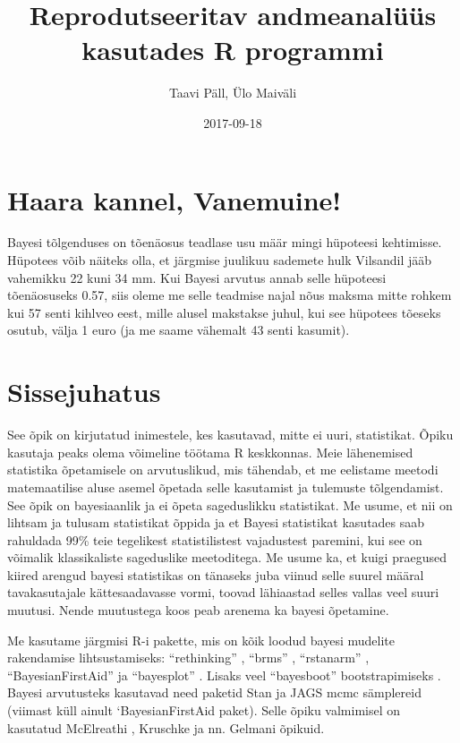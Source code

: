 \documentclass[]{book}
\title{Reprodutseeritav andmeanalüüs kasutades R programmi}
\author{Taavi Päll, Ülo Maiväli}
\date{2017-09-18}
\begin{document}
\maketitle

{
\hypersetup{linkcolor=black}
\setcounter{tocdepth}{1}
\tableofcontents
}
\chapter*{Haara kannel, Vanemuine!}\label{haara-kannel-vanemuine}

Bayesi tõlgenduses on tõenäosus teadlase usu määr mingi hüpoteesi
kehtimisse. Hüpotees võib näiteks olla, et järgmise juulikuu sademete
hulk Vilsandil jääb vahemikku 22 kuni 34 mm. Kui Bayesi arvutus annab
selle hüpoteesi tõenäosuseks 0.57, siis oleme me selle teadmise najal
nõus maksma mitte rohkem kui 57 senti kihlveo eest, mille alusel
makstakse juhul, kui see hüpotees tõeseks osutub, välja 1 euro (ja me
saame vähemalt 43 senti kasumit).

\chapter{Sissejuhatus}\label{intro}

See õpik on kirjutatud inimestele, kes kasutavad, mitte ei uuri,
statistikat. Õpiku kasutaja peaks olema võimeline töötama R keskkonnas.
Meie lähenemised statistika õpetamisele on arvutuslikud, mis tähendab,
et me eelistame meetodi matemaatilise aluse asemel õpetada selle
kasutamist ja tulemuste tõlgendamist. See õpik on bayesiaanlik ja ei
õpeta sageduslikku statistikat. Me usume, et nii on lihtsam ja tulusam
statistikat õppida ja et Bayesi statistikat kasutades saab rahuldada
99\% teie tegelikest statistilistest vajadustest paremini, kui see on
võimalik klassikaliste sageduslike meetoditega. Me usume ka, et kuigi
praegused kiired arengud bayesi statistikas on tänaseks juba viinud
selle suurel määral tavakasutajale kättesaadavasse vormi, toovad
lähiaastad selles vallas veel suuri muutusi. Nende muutustega koos peab
arenema ka bayesi õpetamine.

Me kasutame järgmisi R-i pakette, mis on kõik loodud bayesi mudelite
rakendamise lihtsustamiseks: ``rethinking'' \citep{rethinking}, ``brms''
\citep{brms}, ``rstanarm'' \citep{rstanarm}, ``BayesianFirstAid''
\citep{bayesianfirstaid} ja ``bayesplot'' \citep{bayesplot}. Lisaks veel
``bayesboot'' bootstrapimiseks \citep{bayesboot}. Bayesi arvutusteks
kasutavad need paketid Stan ja JAGS mcmc sämplereid (viimast küll ainult
`BayesianFirstAid paket). Selle õpiku valmimisel on kasutatud McElreathi
\citep{mcelreath2015}, Kruschke \citep{kruschke2014} ja nn. Gelmani
\citep{gelman2014} õpikuid.
\end{document}
